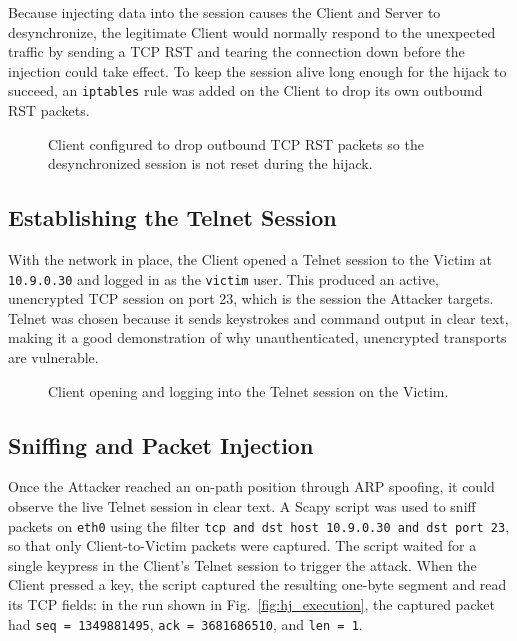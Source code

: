 Because injecting data into the session causes the Client and Server to desynchronize, the legitimate Client would normally respond to the unexpected traffic by sending a TCP RST and tearing the connection down before the injection could take effect. To keep the session alive long enough for the hijack to succeed, an \texttt{iptables} rule was added on the Client to drop its own outbound RST packets.

\begin{figure}[!t]
\centering
{}
\caption{Client configured to drop outbound TCP RST packets so the desynchronized session is not reset during the hijack.}
\label{fig:hj_rst_drop}
\end{figure}

\subsection{Establishing the Telnet Session}

With the network in place, the Client opened a Telnet session to the Victim at \texttt{10.9.0.30} and logged in as the \texttt{victim} user. This produced an active, unencrypted TCP session on port 23, which is the session the Attacker targets. Telnet was chosen because it sends keystrokes and command output in clear text, making it a good demonstration of why unauthenticated, unencrypted transports are vulnerable.

\begin{figure}[!t]
\centering
{}
\caption{Client opening and logging into the Telnet session on the Victim.}
\label{fig:hj_victim_pov}
\end{figure}

\subsection{Sniffing and Packet Injection}

Once the Attacker reached an on-path position through ARP spoofing, it could observe the live Telnet session in clear text. A Scapy script was used to sniff packets on \texttt{eth0} using the filter \texttt{tcp and dst host 10.9.0.30 and dst port 23}, so that only Client-to-Victim packets were captured. The script waited for a single keypress in the Client's Telnet session to trigger the attack. When the Client pressed a key, the script captured the resulting one-byte segment and read its TCP fields: in the run shown in Fig.~\ref{fig:hj_execution}, the captured packet had \texttt{seq = 1349881495}, \texttt{ack = 3681686510}, and \texttt{len = 1}.

